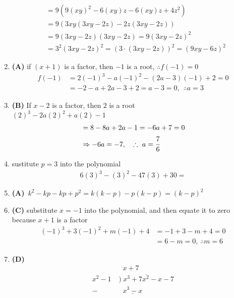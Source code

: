 \begin{multicols}{2}
\begin{enumerate}[label={\textbf{\arabic*.}}]
\begin{align*}
&= 9\left(9(xy)^2 - 6(xy)z - 6(xy)z + 4z^2\right) \\
&= 9\left(3xy(3xy - 2z) - 2z(3xy - 2z)\right) \\
&= 9\left(3xy - 2z\right)\left(3xy - 2z\right) = 9(3xy -2z)^2 \\
& = 3^2(3xy -2z)^2 = (3 \cdot (3xy -2z))^2 = (9xy -6z)^2
\end{align*}
\item \textbf{(A)} if $(x+1)$ is a factor, then  $-1$ is a root, $\therefore  f(-1) = 0$
\begin{align*}
f(-1) &= 2(-1)^3 -a(-1)^2 -(2a-3)(-1) + 2 = 0 \\
& = -2 -a + 2a -3 + 2 = a -3 =0 , \hspace{5pt} \therefore a = 3
\end{align*}
\item \textbf{(B)} If $x-2$ is a factor, then $2$ is a root\\
$(2)^3 -2a(2)^2 + a(2) - 1$ \vspace{-10pt}
\begin{align*}
&= 8 - 8a + 2a - 1 = -6a + 7 = 0 \\
& \Rightarrow -6a = -7, \hspace{10pt} \therefore \,\, a = \cfrac{7}{6}
\end{align*}
\item sustitute $p = 3$ into the polynomial
\begin{align*}
6(3)^3 -(3)^2 -47(3) + 30 =
\end{align*}
\item \textbf{(A)} $ \, k^2 -kp -kp + p^2 = k(k-p) -p(k-p) = (k-p)^2$
\item \textbf{(C)} substitute $x=-1$ into the polynomial, and then equate it to zero because $x+1$ is a factor \\
\begin{align*}
(-1)^3 + 3(-1)^2 + m(-1) + 4 & = -1 + 3 -m + 4 = 0 \\
& = 6- m  = 0, \, \therefore m = 6
\end{align*}
\item \textbf{(D)}
\begin{align*}
& \hspace{7pt} x + 7\\
x^2 - 1\hspace{3pt}  & \overline{) \hspace{3pt} x^3 + 7x^2 - x - 7} \\
-& \hspace{7pt} \underline{x^3 - x} \\

\end{align*}
\end{enumerate}
\end{multicols}
